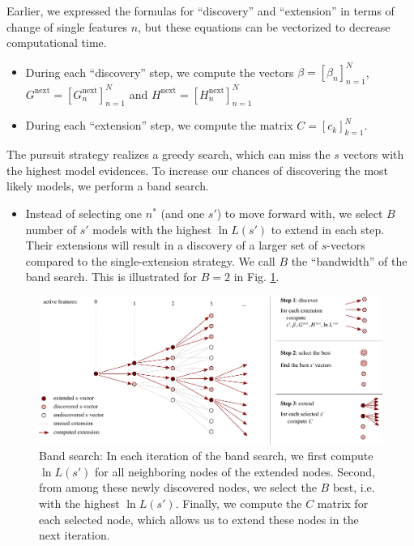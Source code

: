 \documentclass[letter,10pt,oneside]{article}
\newcommand{\+}{^\dagger}
\newcommand{\s}{^\ast}
\newcommand{\reffig}[1]{Fig. \ref{#1}}
\begin{document}
Earlier, we expressed the formulas for ``discovery'' and ``extension'' in terms of change of single features $n$, but these equations can be vectorized to decrease computational time.
\begin{itemize}
  \item During each ``discovery'' step, we compute the vectors $\beta = [\beta_n]_{n=1}^N$, $G^\text{next} = [G^\text{next}_n]_{n=1}^N$ and $H^\text{next} = [H^\text{next}_n]_{n=1}^N$
  \item During each ``extension'' step, we compute the matrix $C = [c_k]_{k=1}^N$.
\end{itemize}

The pursuit strategy realizes a greedy search, which can miss the $s$ vectors with the highest model evidences. To increase our chances of discovering the most likely models, we perform a band search.

\begin{itemize}
  \item Instead of selecting one $n\s$ (and one $s'$) to move forward with, we select $B$ number of $s'$ models with the highest $\ln L(s')$ to extend in each step. Their extensions will result in a discovery of a larger set of $s$-vectors compared to the single-extension strategy. We call $B$ the ``bandwidth'' of the band search. This is illustrated for $B = 2$ in \reffig{fig:band_search}.
\end{itemize}
\begin{figure}[h]
  \centering
  \includegraphics[width=\textwidth]{figs/extension.pdf}
  \caption{
    \label{fig:band_search}
    Band search: In each iteration of the band search, we first compute $\ln L(s')$ for all neighboring nodes of the extended nodes. Second, from among these newly discovered nodes, we select the $B$ best, i.e. with the highest $\ln L(s')$. Finally, we compute the $C$ matrix for each selected node, which allows us to extend these nodes in the next iteration.
  }
\end{figure}
\end{document}
